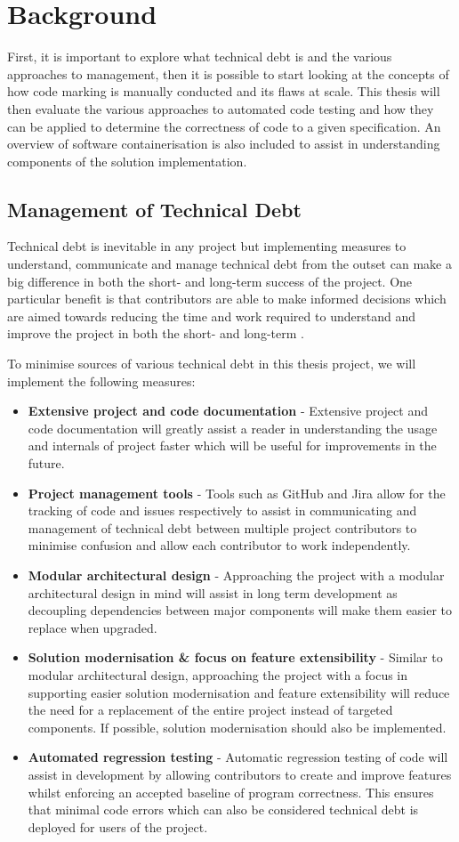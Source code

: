 \documentclass[hidelinks]{report}
\newcommand{\unchapter}[2]{
    \setcounter{chapter}{#1}
    \setcounter{section}{0}
    \chapter*{#2}
    \addcontentsline{toc}{chapter}{#2}
}
\begin{document}
\unchapter{2}{Background}

First, it is important to explore what technical debt is and the various approaches to management, then it is possible to start looking at the concepts of how code marking is manually conducted and its flaws at scale. This thesis will then evaluate the various approaches to automated code testing and how they can be applied to determine the correctness of code to a given specification. An overview of software containerisation is also included to assist in understanding components of the solution implementation.

\section{Management of Technical Debt}

Technical debt is inevitable in any project but implementing measures to understand, communicate and manage technical debt from the outset can make a big difference in both the short- and long-term success of the project. One particular benefit is that contributors are able to make informed decisions which are aimed towards reducing the time and work required to understand and improve the project in both the short- and long-term \cite{TechnicalDebtManagement}.

To minimise sources of various technical debt in this thesis project, we will implement the following measures:
\begin{itemize}
	\item \textbf{Extensive project and code documentation} - Extensive project and code documentation will greatly assist a reader in understanding the usage and internals of project faster which will be useful for improvements in the future.
	\item \textbf{Project management tools} - Tools such as GitHub and Jira allow for the tracking of code and issues respectively to assist in communicating and management of technical debt between multiple project contributors to minimise confusion and allow each contributor to work independently.
	\item \textbf{Modular architectural design} - Approaching the project with a modular architectural design in mind will assist in long term development as decoupling dependencies between major components will make them easier to replace when upgraded.
	\item \textbf{Solution modernisation \& focus on feature extensibility} - Similar to modular architectural design, approaching the project with a focus in supporting easier solution modernisation and feature extensibility will reduce the need for a replacement of the entire project instead of targeted components. If possible, solution modernisation should also be implemented.
	\item \textbf{Automated regression testing} - Automatic regression testing of code will assist in development by allowing contributors to create and improve features whilst enforcing an accepted baseline of program correctness. This ensures that minimal code errors which can also be considered technical debt is deployed for users of the project.
\end{itemize}
\end{document}
